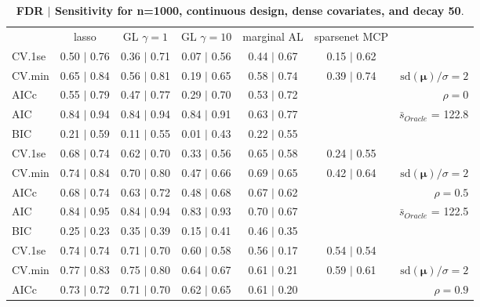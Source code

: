 \clearpage
\begin{table}\vspace{-.5cm}
\caption[l]{ {\it }
{ \bf FDR $\boldsymbol{\mid}$ Sensitivity for n=1000, continuous design, dense covariates, and  decay  50}.}
\vspace{-.5cm}
\footnotesize{}
\begin{center}
\begin{tabular}{l*{5}{c}|r}
 & lasso & GL $\gamma=1$ & GL $\gamma=10$ & marginal AL & sparsenet MCP  & \\
 \cline{1-7}
CV.1se & 0.50 $\mid$ 0.76 & 0.36 $\mid$ 0.71 & 0.07 $\mid$ 0.56 & 0.44 $\mid$ 0.67 & 0.15 $\mid$ 0.62 & \\
CV.min & 0.65 $\mid$ 0.84 & 0.56 $\mid$ 0.81 & 0.19 $\mid$ 0.65 & 0.58 $\mid$ 0.74 & 0.39 $\mid$ 0.74 &  $\mathrm{sd}(\mathbf{\mu})/\sigma=2$ \\
AICc & 0.55 $\mid$ 0.79 & 0.47 $\mid$ 0.77 & 0.29 $\mid$ 0.70 & 0.53 $\mid$ 0.72 & & $\rho=0$ \\
AIC & 0.84 $\mid$ 0.94 & 0.84 $\mid$ 0.94 & 0.84 $\mid$ 0.91 & 0.63 $\mid$ 0.77 & &  \multirow{2}{*}{$\bar{s}_{Oracle}$ = 122.8} \\
BIC & 0.21 $\mid$ 0.59 & 0.11 $\mid$ 0.55 & 0.01 $\mid$ 0.43 & 0.22 $\mid$ 0.55 & &  \\
 \hline 
CV.1se & 0.68 $\mid$ 0.74 & 0.62 $\mid$ 0.70 & 0.33 $\mid$ 0.56 & 0.65 $\mid$ 0.58 & 0.24 $\mid$ 0.55 & \\
CV.min & 0.74 $\mid$ 0.84 & 0.70 $\mid$ 0.80 & 0.47 $\mid$ 0.66 & 0.69 $\mid$ 0.65 & 0.42 $\mid$ 0.64 &  $\mathrm{sd}(\mathbf{\mu})/\sigma=2$ \\
AICc & 0.68 $\mid$ 0.74 & 0.63 $\mid$ 0.72 & 0.48 $\mid$ 0.68 & 0.67 $\mid$ 0.62 & & $\rho=0.5$ \\
AIC & 0.84 $\mid$ 0.95 & 0.84 $\mid$ 0.94 & 0.83 $\mid$ 0.93 & 0.70 $\mid$ 0.67 & &  \multirow{2}{*}{$\bar{s}_{Oracle}$ = 122.5} \\
BIC & 0.25 $\mid$ 0.23 & 0.35 $\mid$ 0.39 & 0.15 $\mid$ 0.41 & 0.46 $\mid$ 0.35 & &  \\
 \hline 
CV.1se & 0.74 $\mid$ 0.74 & 0.71 $\mid$ 0.70 & 0.60 $\mid$ 0.58 & 0.56 $\mid$ 0.17 & 0.54 $\mid$ 0.54 & \\
CV.min & 0.77 $\mid$ 0.83 & 0.75 $\mid$ 0.80 & 0.64 $\mid$ 0.67 & 0.61 $\mid$ 0.21 & 0.59 $\mid$ 0.61 &  $\mathrm{sd}(\mathbf{\mu})/\sigma=2$ \\
AICc & 0.73 $\mid$ 0.72 & 0.71 $\mid$ 0.70 & 0.62 $\mid$ 0.65 & 0.61 $\mid$ 0.20 & & $\rho=0.9$ \\

\end{tabular}
\end{center}
\end{table}
